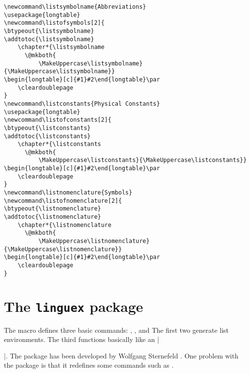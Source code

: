 \begin{Verbatim}
\newcommand\listsymbolname{Abbreviations}
\usepackage{longtable}
\newcommand\listofsymbols[2]{
\btypeout{\listsymbolname}
\addtotoc{\listsymbolname}
    \chapter*{\listsymbolname
      \@mkboth{
          \MakeUppercase\listsymbolname}{\MakeUppercase\listsymbolname}}
\begin{longtable}[c]{#1}#2\end{longtable}\par
    \cleardoublepage
}
\newcommand\listconstants{Physical Constants}
\usepackage{longtable}
\newcommand\listofconstants[2]{
\btypeout{\listconstants}
\addtotoc{\listconstants}
    \chapter*{\listconstants
      \@mkboth{
          \MakeUppercase\listconstants}{\MakeUppercase\listconstants}}
\begin{longtable}[c]{#1}#2\end{longtable}\par
    \cleardoublepage
}
\newcommand\listnomenclature{Symbols}
\newcommand\listofnomenclature[2]{
\btypeout{\listnomenclature}
\addtotoc{\listnomenclature}
    \chapter*{\listnomenclature
      \@mkboth{
          \MakeUppercase\listnomenclature}{\MakeUppercase\listnomenclature}}
\begin{longtable}[c]{#1}#2\end{longtable}\par
    \cleardoublepage
}

\end{Verbatim}



\section{The \protect\texttt{linguex} package}
The  macro defines three basic commands: , , and  The first
two generate list environments. The third functions basically like an |\item|.
The package has been developed by Wolfgang Sternefeld 
. One problem with the package is that it redefines some commands such as .

